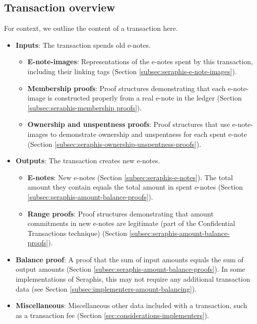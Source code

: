 \subsection{Transaction overview}
\label{subsec:seraphis-transaction-overview}

For context, we outline the content of a transaction here.

\begin{itemize}
    \item \textbf{Inputs}: The transaction spends old e-notes.
    \begin{itemize}
        \item \textbf{E-note-images}: Representations of the e-notes spent by this transaction, including their linking tags (Section \ref{subsec:seraphis-e-note-images}).
        \item \textbf{Membership proofs}: Proof structures demonstrating that each e-note-image is constructed properly from a real e-note in the ledger (Section \ref{subsec:seraphis-membership proofs}).
        \item \textbf{Ownership and unspentness proofs}: Proof structures that use e-note-images to demonstrate ownership and unspentness for each spent e-note (Section \ref{subsec:seraphis-ownership-unspentness-proofs}).
    \end{itemize}
    \item \textbf{Outputs}: The transaction creates new e-notes.
    \begin{itemize}
        \item \textbf{E-notes}: New e-notes (Section \ref{subsec:seraphis-e-notes}). The total amount they contain equals the total amount in spent e-notes (Section \ref{subsec:seraphis-amount-balance-proofs}).
        \item \textbf{Range proofs}: Proof structures demonstrating that amount commitments in new e-notes are legitimate (part of the Confidential Transactions technique) (Section \ref{subsec:seraphis-amount-balance-proofs}).
    \end{itemize}
    \item \textbf{Balance proof}: A proof that the sum of input amounts equals the sum of output amounts (Section \ref{subsec:seraphis-amount-balance-proofs}). In some implementations of Seraphis, this may not require any additional transaction data (see Section \ref{subsec:implementers-amount-balancing}).
    \item \textbf{Miscellaneous}: Miscellaneous other data included with a transaction, such as a transaction fee (Section \ref{sec:considerations-implementers}).
\end{itemize}


